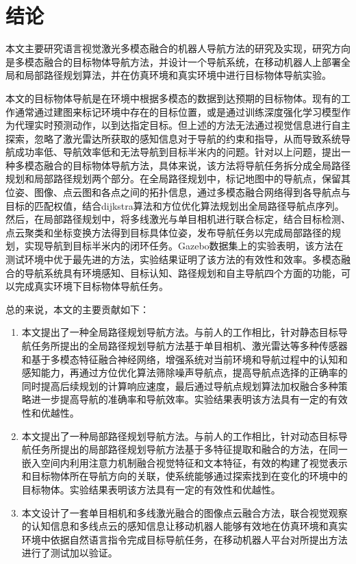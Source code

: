 \chapter{结\texorpdfstring{\quad}{}论}

本文主要研究语言视觉激光多模态融合的机器人导航方法的研究及实现，研究方向是多模态融合的目标物体导航方法，并设计一个导航系统，在移动机器人上部署全局和局部路径规划算法，并在仿真环境和真实环境中进行目标物体导航实验。
	
本文的目标物体导航是在环境中根据多模态的数据到达预期的目标物体。现有的工作通常通过建图来标记环境中存在的目标位置，或是通过训练深度强化学习模型作为代理实时预测动作，以到达指定目标。但上述的方法无法通过视觉信息进行自主探索，忽略了激光雷达所获取的感知信息对于导航的约束和指导，从而导致系统导航成功率低、导航效率低和无法导航到目标半米内的问题。针对以上问题，提出一种多模态融合的目标物体导航方法，具体来说，该方法将导航任务拆分成全局路径规划和局部路径规划两个部分。在全局路径规划中，标记地图中的导航点，保留其位姿、图像、点云图和各点之间的拓扑信息，通过多模态融合网络得到各导航点与目标的匹配权值，结合dijkstra算法和方位优化算法规划出全局路径导航点序列。然后，在局部路径规划中，将多线激光与单目相机进行联合标定，结合目标检测、点云聚类和坐标变换方法得到目标具体位姿，发布导航任务以完成局部路径的规划，实现导航到目标半米内的闭环任务。Gazebo数据集上的实验表明，该方法在测试环境中优于最先进的方法，实验结果证明了该方法的有效性和效率。多模态融合的导航系统具有环境感知、目标认知、路径规划和自主导航四个方面的功能，可以完成真实环境下目标物体导航任务。

总的来说，本文的主要贡献如下：
\begin{enumerate}[topsep = 0 pt, itemsep= 0 pt, parsep=0pt, partopsep=0pt, leftmargin=44pt, itemindent=0pt, labelsep=6pt, label=(\arabic*)]
    \item 	本文提出了一种全局路径规划导航方法。与前人的工作相比，针对静态目标导航任务所提出的全局路径规划导航方法基于单目相机、激光雷达等多种传感器和基于多模态特征融合神经网络，增强系统对当前环境和导航过程中的认知和感知能力，再通过方位优化算法筛除噪声导航点，提高导航点选择的正确率的同时提高后续规划的计算响应速度，最后通过导航点规划算法加权融合多种策略进一步提高导航的准确率和导航效率。实验结果表明该方法具有一定的有效性和优越性。
    \item	本文提出了一种局部路径规划导航方法。与前人的工作相比，针对动态目标导航任务所提出的局部路径规划导航方法基于多特征提取和融合的方法，在同一嵌入空间内利用注意力机制融合视觉特征和文本特征，有效的构建了视觉表示和目标物体所在导航方向的关联，使系统能够通过探索找到在变化的环境中的目标物体。实验结果表明该方法具有一定的有效性和优越性。
    \item	本文设计了一套单目相机和多线激光融合的图像点云融合方法，联合视觉观察的认知信息和多线点云的感知信息让移动机器人能够有效地在仿真环境和真实环境中依据自然语言指令完成目标导航任务，在移动机器人平台对所提出方法进行了测试加以验证。
\end{enumerate}



